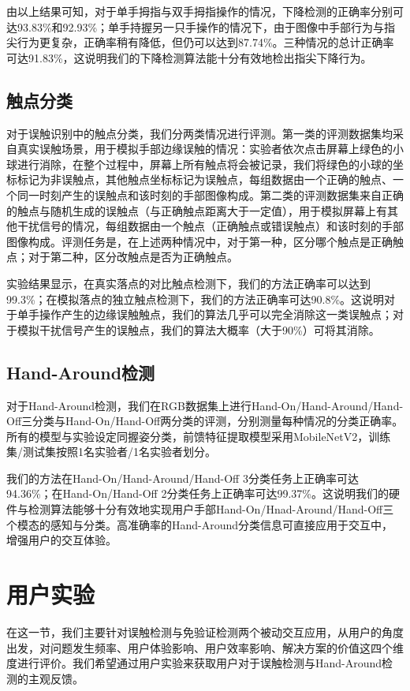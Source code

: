 由以上结果可知，对于单手拇指与双手拇指操作的情况，下降检测的正确率分别可达93.83\%和92.93\%；单手持握另一只手操作的情况下，由于图像中手部行为与指尖行为更复杂，正确率稍有降低，但仍可以达到87.74\%。三种情况的总计正确率可达91.83\%，这说明我们的下降检测算法能十分有效地检出指尖下降行为。

\subsection{触点分类}

对于误触识别中的触点分类，我们分两类情况进行评测。第一类的评测数据集均采自真实误触场景，用于模拟手部边缘误触的情况：实验者依次点击屏幕上绿色的小球进行消除，在整个过程中，屏幕上所有触点将会被记录，我们将绿色的小球的坐标标记为非误触点，其他触点坐标标记为误触点，每组数据由一个正确的触点、一个同一时刻产生的误触点和该时刻的手部图像构成。第二类的评测数据集来自正确的触点与随机生成的误触点（与正确触点距离大于一定值），用于模拟屏幕上有其他干扰信号的情况，每组数据由一个触点（正确触点或错误触点）和该时刻的手部图像构成。评测任务是，在上述两种情况中，对于第一种，区分哪个触点是正确触点；对于第二种，区分改触点是否为正确触点。

实验结果显示，在真实落点的对比触点检测下，我们的方法正确率可以达到99.3\%；在模拟落点的独立触点检测下，我们的方法正确率可达90.8\%。这说明对于单手操作产生的边缘误触触点，我们的算法几乎可以完全消除这一类误触点；对于模拟干扰信号产生的误触点，我们的算法大概率（大于90\%）可将其消除。

\subsection{Hand-Around检测}

对于Hand-Around检测，我们在RGB数据集上进行Hand-On/Hand-Around/Hand-Off三分类与Hand-On/Hand-Off两分类的评测，分别测量每种情况的分类正确率。所有的模型与实验设定同握姿分类，前馈特征提取模型采用MobileNetV2，训练集/测试集按照1名实验者/1名实验者划分。

我们的方法在Hand-On/Hand-Around/Hand-Off 3分类任务上正确率可达94.36\%；在Hand-On/Hand-Off 2分类任务上正确率可达99.37\%。这说明我们的硬件与检测算法能够十分有效地实现用户手部Hand-On/Hnad-Around/Hand-Off三个模态的感知与分类。高准确率的Hand-Around分类信息可直接应用于交互中，增强用户的交互体验。

\section{用户实验}

在这一节，我们主要针对误触检测与免验证检测两个被动交互应用，从用户的角度出发，对问题发生频率、用户体验影响、用户效率影响、解决方案的价值这四个维度进行评价。我们希望通过用户实验来获取用户对于误触检测与Hand-Around检测的主观反馈。

